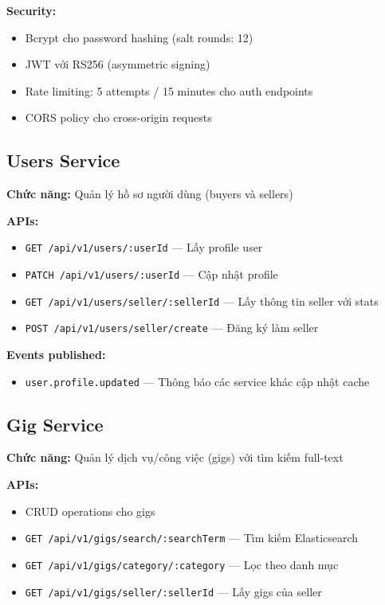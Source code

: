 \documentclass[12pt]{extreport}
\begin{document}
\textbf{Security:}
\begin{itemize}
    \item Bcrypt cho password hashing (salt rounds: 12)
    \item JWT với RS256 (asymmetric signing)
    \item Rate limiting: 5 attempts / 15 minutes cho auth endpoints
    \item CORS policy cho cross-origin requests
\end{itemize}

\subsection{Users Service}

\textbf{Chức năng:} Quản lý hồ sơ người dùng (buyers và sellers)

\textbf{APIs:}
\begin{itemize}
    \item \texttt{GET /api/v1/users/:userId} --- Lấy profile user
    \item \texttt{PATCH /api/v1/users/:userId} --- Cập nhật profile
    \item \texttt{GET /api/v1/users/seller/:sellerId} --- Lấy thông tin seller với stats
    \item \texttt{POST /api/v1/users/seller/create} --- Đăng ký làm seller
\end{itemize}

\textbf{Events published:}
\begin{itemize}
    \item \texttt{user.profile.updated} --- Thông báo các service khác cập nhật cache
\end{itemize}

\subsection{Gig Service}

\textbf{Chức năng:} Quản lý dịch vụ/công việc (gigs) với tìm kiếm full-text

\textbf{APIs:}
\begin{itemize}
    \item CRUD operations cho gigs
    \item \texttt{GET /api/v1/gigs/search/:searchTerm} --- Tìm kiếm Elasticsearch
    \item \texttt{GET /api/v1/gigs/category/:category} --- Lọc theo danh mục
    \item \texttt{GET /api/v1/gigs/seller/:sellerId} --- Lấy gigs của seller
\end{itemize}
\end{document}
